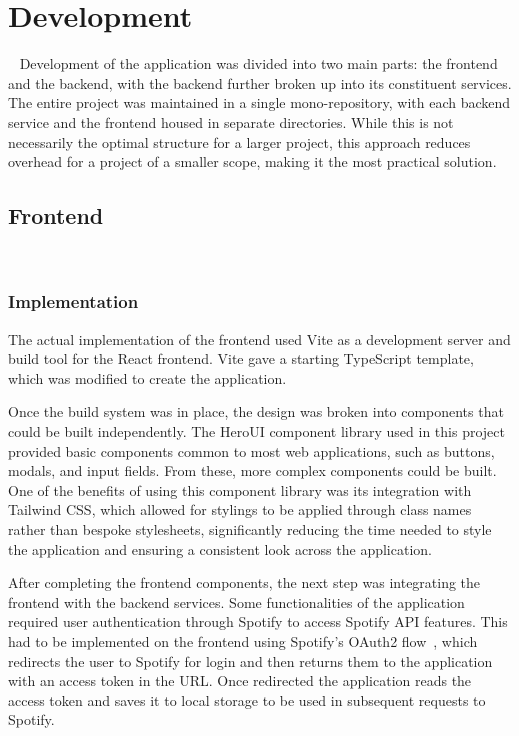 \chapter{Development}~\label{cha:development}
Development of the application was divided into two main parts: the frontend and the backend, with the backend further broken up into its constituent services. The entire project was maintained in a single mono-repository, with each backend service and the frontend housed in separate directories. While this is not necessarily the optimal structure for a larger project, this approach reduces overhead for a project of a smaller scope, making it the most practical solution.

\section{Frontend}~\label{sec:frontend-development}
\subsection{Implementation}
The actual implementation of the frontend used Vite as a development server and build tool for the React frontend. Vite gave a starting TypeScript template, which was modified to create the application.

Once the build system was in place, the design was broken into components that could be built independently. The HeroUI component library used in this project provided basic components common to most web applications, such as buttons, modals, and input fields. From these, more complex components could be built. One of the benefits of using this component library was its integration with Tailwind CSS, which allowed for stylings to be applied through class names rather than bespoke stylesheets, significantly reducing the time needed to style the application and ensuring a consistent look across the application.

After completing the frontend components, the next step was integrating the frontend with the backend services. Some functionalities of the application required user authentication through Spotify to access Spotify API features. This had to be implemented on the frontend using Spotify’s OAuth2 flow~\cite{SpotifyOAuth}, which redirects the user to Spotify for login and then returns them to the application with an access token in the URL. Once redirected the application reads the access token and saves it to local storage to be used in subsequent requests to Spotify.

